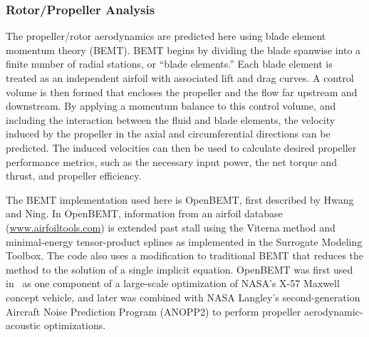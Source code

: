\subsubsection{Rotor/Propeller Analysis} %
The propeller/rotor aerodynamics are predicted here using blade element momentum theory (BEMT).
BEMT begins by dividing the blade spanwise into a finite number of radial stations, or ``blade elements.''
Each blade element is treated as an independent airfoil with associated lift and drag curves.
A control volume is then formed that encloses the propeller and the flow far upstream and downstream.
By applying a momentum balance to this control volume, and including the interaction between the fluid and blade elements, the velocity induced by the propeller in the axial and circumferential directions can be predicted.
The induced velocities can then be used to calculate desired propeller performance metrics, such as the necessary input power, the net torque and thrust, and propeller efficiency.

The BEMT implementation used here is OpenBEMT, first described by Hwang and Ning\cite{hwang_optimization_of_electric_aircraft_odm_2018}.
In OpenBEMT, information from an airfoil database (\url{www.airfoiltools.com}) is extended past stall using the Viterna method\cite{viterna_theoretical_and_exp_power_from_large_horizontal_wind_turbines_1982} and minimal-energy tensor-product splines as implemented in the Surrogate Modeling Toolbox\cite{hwang_fast_prediction_surrogate_model_2018}.
The code also uses a modification to traditional BEMT that reduces the method to the solution of a single implicit equation\cite{ning_simple_solution_to_bemt_equations_2013}.
OpenBEMT was first used in~\cite{hwang_optimization_of_electric_aircraft_odm_2018} as one component of a large-scale optimization of NASA's X-57 Maxwell concept vehicle, and later\cite{ingraham_gradient_based_prop_opt_acoustic_constraints_2019} was combined with NASA Langley's second-generation Aircraft Noise Prediction Program\cite{lopes_design_of_anopp2_2011,lopes2016anopp2} (ANOPP2) to perform propeller aerodynamic-acoustic optimizations.

